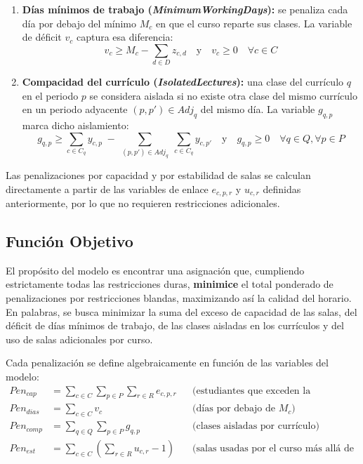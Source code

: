 \documentclass[letter, 10pt]{article}
\begin{document}
\begin{enumerate}
    \item \textbf{Días mínimos de trabajo (\textit{MinimumWorkingDays}):} se penaliza cada día por debajo del mínimo $M_c$ en que el curso reparte sus clases. La variable de déficit $v_c$ captura esa diferencia:
    \begin{equation}
    v_c \geq M_c - \sum_{d \in D} z_{c,d} \quad \text{y} \quad v_c \geq 0 \quad \forall c \in C
    \end{equation}

    \item \textbf{Compacidad del currículo (\textit{IsolatedLectures}):} una clase del currículo $q$ en el periodo $p$ se considera aislada si no existe otra clase del mismo currículo en un periodo adyacente $(p, p') \in Adj_q$ del mismo día. La variable $g_{q,p}$ marca dicho aislamiento:
    \begin{equation}
    g_{q,p} \geq \sum_{c \in C_q} y_{c,p} \;-\; \sum_{(p,p') \in Adj_q} \; \sum_{c \in C_q} y_{c,p'} \quad \text{y} \quad g_{q,p} \geq 0 \quad \forall q \in Q, \forall p \in P
    \end{equation}
\end{enumerate}

Las penalizaciones por capacidad y por estabilidad de salas se calculan directamente a partir de las variables de enlace $e_{c,p,r}$ y $u_{c,r}$ definidas anteriormente, por lo que no requieren restricciones adicionales.

\subsection{Función Objetivo}
El propósito del modelo es encontrar una asignación que, cumpliendo estrictamente todas las restricciones duras, \textbf{minimice} el total ponderado de penalizaciones por restricciones blandas, maximizando así la calidad del horario. En palabras, se busca minimizar la suma del exceso de capacidad de las salas, del déficit de días mínimos de trabajo, de las clases aisladas en los currículos y del uso de salas adicionales por curso.

Cada penalización se define algebraicamente en función de las variables del modelo:
\begin{align}
    Pen_{cap}  &= \sum_{c \in C} \sum_{p \in P} \sum_{r \in R} e_{c,p,r} && \text{(estudiantes que exceden la capacidad)} \\
    Pen_{dias} &= \sum_{c \in C} v_c && \text{(días por debajo de } M_c \text{)} \\
    Pen_{comp} &= \sum_{q \in Q} \sum_{p \in P} g_{q,p} && \text{(clases aisladas por currículo)} \\
    Pen_{est}  &= \sum_{c \in C} \left( \sum_{r \in R} u_{c,r} - 1 \right) && \text{(salas usadas por el curso más allá de la primera)}
\end{align}
\end{document}
